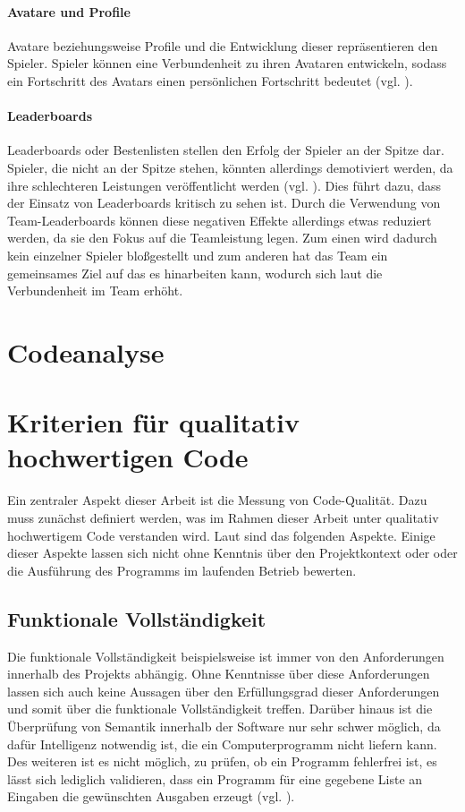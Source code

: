 \documentclass[
	oneside,  %
	ngerman, 
	final, 
	11pt, 
	a4paper, 
	1.1headlines, 
	headinclude=false, 
	footinclude=false, 
	mpinclude=false, 
	pagesize, 
	onecolumn, 
	titlepage, 
	parskip=half, 
	headsepline, 
	chapterprefix=false, 
	version=first, 
	listof=totoc, 
	bibliography=totoc, 
	toc=graduated, 
	fleqn
]{scrbook}
\begin{document}
\paragraph{Avatare und Profile}
Avatare beziehungsweise Profile und die Entwicklung dieser repräsentieren den Spieler.
Spieler können eine Verbundenheit zu ihren Avataren entwickeln, sodass ein Fortschritt des Avatars einen persönlichen Fortschritt bedeutet (vgl. \cite{SH2014}).

\paragraph{Leaderboards}
Leaderboards oder Bestenlisten stellen den Erfolg der Spieler an der Spitze dar.
Spieler, die nicht an der Spitze stehen, könnten allerdings demotiviert werden, da ihre schlechteren Leistungen veröffentlicht werden (vgl. \cite{SH2014}).
Dies führt dazu, dass der Einsatz von Leaderboards kritisch zu sehen ist.
Durch die Verwendung von Team-Leaderboards können diese negativen Effekte allerdings etwas reduziert werden, da sie den Fokus auf die Teamleistung legen.
Zum einen wird dadurch kein einzelner Spieler bloßgestellt und zum anderen hat das Team ein gemeinsames Ziel auf das es hinarbeiten kann, wodurch sich laut \cite{SH2014} die Verbundenheit im Team erhöht. 

\section{Codeanalyse}
\label{Codeanalyse}


\section{Kriterien für qualitativ hochwertigen Code}
\label{Kriterien_guter_Code}
Ein zentraler Aspekt dieser Arbeit ist die Messung von Code-Qualität.
Dazu muss zunächst definiert werden, was im Rahmen dieser Arbeit unter qualitativ hochwertigem Code verstanden wird.
Laut \cite{ISO-25010} sind das folgenden Aspekte.
Einige dieser Aspekte lassen sich nicht ohne Kenntnis über den Projektkontext oder oder die Ausführung des Programms im laufenden Betrieb bewerten.

\subsection{Funktionale Vollständigkeit}
Die funktionale Vollständigkeit beispielsweise ist immer von den Anforderungen innerhalb des Projekts abhängig.
Ohne Kenntnisse über diese Anforderungen lassen sich auch keine Aussagen über den Erfüllungsgrad dieser Anforderungen und somit über die funktionale Vollständigkeit treffen.
Darüber hinaus ist die Überprüfung von Semantik innerhalb der Software nur sehr schwer möglich, da dafür Intelligenz notwendig ist, die ein Computerprogramm nicht liefern kann.
Des weiteren ist es nicht möglich, zu prüfen, ob ein Programm fehlerfrei ist, es lässt sich lediglich validieren, dass ein Programm für eine gegebene Liste an Eingaben die gewünschten Ausgaben erzeugt (vgl. \cite{Di1972}).
\end{document}
